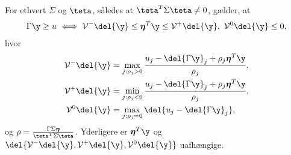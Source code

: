%
\begin{lem} \label{lem:polyhedral}
For ethvert \(\Sigma\) og \(\teta\), således at \(\teta^T \Sigma \teta \neq 0\), gælder, at
\begin{align}
\Gamma \y \geq u \ \Longleftrightarrow \ \mathcal{V}^- \del{\y} \leq \boldsymbol{\eta}^T \y \leq \mathcal{V}^+ \del{\y}, \  \mathcal{V}^0 \del{\y} \leq 0, \label{eq:post_8}
\end{align}
hvor
\begin{align}
\mathcal{V}^- \del{\y} &= \max_{j: \rho_j > 0} \frac{u_j - \del{\Gamma \y}_j + \rho_j \boldsymbol{\eta}^T \y}{\rho_j}, \label{eq:V-} \\
\mathcal{V}^+ \del{\y} &= \min_{j: \rho_j < 0} \frac{u_j - \del{\Gamma \y}_j + \rho_j \boldsymbol{\eta}^T \y}{\rho_j}, \label{eq:V+} \\
\mathcal{V}^0 \del{\y} &= \max_{j: \rho_j = 0} \del{u_j - \del{\Gamma \y}_j}, \label{eq:V0} 
\end{align}
og \(\rho=\frac{\Gamma \Sigma \boldsymbol{\eta}}{\teta^T \Sigma \teta}\).
Yderligere  er \(\boldsymbol{\eta}^T \y\) og \(\del{\mathcal{V}^-\del{\y}, \mathcal{V}^+\del{\y},\mathcal{V}^0\del{\y}}\) uafhængige. 
\end{lem}
